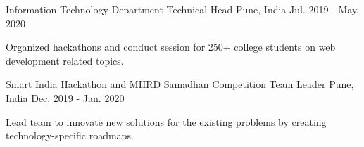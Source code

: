 

\begin{cventries}

  \cventry
    {Information Technology Department} %
    {Technical Head} %
    {Pune, India} %
    {Jul. 2019 - May. 2020} %
    {
      \begin{cvitems} %
        \item {Organized hackathons and conduct session for 250+ college students on web development related topics.}
      \end{cvitems}
    }


  \cventry
    {Smart India Hackathon and MHRD Samadhan Competition} %
    {Team Leader} %
    {Pune, India} %
    {Dec. 2019 - Jan. 2020} %
    {
      \begin{cvitems} %
        \item {Lead team to innovate new solutions for the existing problems by creating technology-specific roadmaps. }
      \end{cvitems}
    }

\end{cventries}
